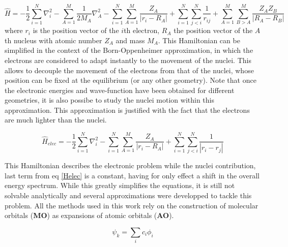 \documentclass[12pt]{report}
\numberwithin{equation}{section}
\begin{document}
\begin{equation}\label{Helec}
    \hat{H}=-\frac{1}{2}\sum_{i=1}^{N}\nabla_i^2-\sum_{A=1}^{M}\frac{1}{2M_A}\nabla_A^2%
    -\sum_{i=1}^{N}\sum_{A=1}^{M}\frac{Z_A}{|r_i-R_A|}+\sum_{i=1}^{N}\sum_{j<i}^{N}\frac{1}{r_{ij}}%
    +\sum_{A=1}^{M}\sum_{B>A}^{M}\frac{Z_A Z_B}{|R_A-R_B|}
\end{equation}
where $r_i$ is the position vector of the $i$th electron, $R_A$ the position vector of the $A$th nucleus with atomic number $Z_A$ and mass $M_A$.
This Hamiltonian can be simplified in the context of the Born-Oppenheimer approximation, in which the electrons are considered to adapt instantly to the movement of the nuclei.
This allows to decouple the movement of the electrons from that of the nuclei, whose position can be fixed at the equilibrium (or any other geometry).
Note that once the electronic energies and wave-function have been obtained for different geometries, it is also possibe to study the nuclei motion within this approximation.
This approximation is justified with the fact that the electrons are much lighter than the nuclei. 

\begin{equation}\label{HBO}
    \hat{H}_{elec}=-\frac{1}{2}\sum_{i=1}^{N}\nabla_i^2%
    -\sum_{i=1}^{N}\sum_{A=1}^{M}\frac{Z_A}{|r_i-R_A|}+\sum_{i=1}^{N}\sum_{j<i}^{N}\frac{1}{|r_i-r_j|}%
\end{equation}

This Hamiltonian describes the electronic problem while the nuclei contribution, last term from eq \ref{Helec} is a constant, having for only effect a shift in the overall energy spectrum. 
While this greatly simplifies the equations, it is still not solvable analytically and several approximations were developped to tackle this problem. %
All the methods used in this work rely on the construction of molecular orbitals (\textbf{MO}) as expansions of atomic orbitals (\textbf{AO}).

\begin{equation}
    \psi_k=\sum_{i}c_i \phi_i
\end{equation}
\end{document}
